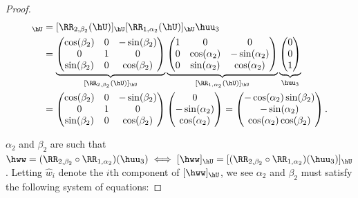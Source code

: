 \begin{proof}
    \begin{align*}
        [(\RR_{2, \beta_2} \circ \RR_{1, \alpha_2})(\huu_3)]_{\hU} &=
        [\RR_{2, \beta_2}(\hU)]_{\hU} [\RR_{1, \alpha_2}(\hU)]_{\hU} \huu_3 \\
        &=
        \underbrace
        {
            \begin{pmatrix}
                \cos(\beta_2) & 0 & -\sin(\beta_2) \\
                0 & 1 & 0 \\
                \sin(\beta_2) & 0 & \cos(\beta_2)
            \end{pmatrix}
        }_{[\RR_{2, \beta_2}(\hU)]_{\hU}}
        \underbrace
        {
            \begin{pmatrix}
                1 & 0 & 0 \\
                0 & \cos(\alpha_2) & -\sin(\alpha_2) \\
                0 & \sin(\alpha_2) & \cos(\alpha_2)
            \end{pmatrix}
        }_{[\RR_{1, \alpha_2}(\hU)]_{\hU}}
        \underbrace
        {
            \begin{pmatrix}
                0 \\ 0 \\ 1
            \end{pmatrix}
        }_{\huu_3} \\
        &=
        \begin{pmatrix}
            \cos(\beta_2) & 0 & -\sin(\beta_2) \\
            0 & 1 & 0 \\
            \sin(\beta_2) & 0 & \cos(\beta_2)
        \end{pmatrix}
        \begin{pmatrix}
            0 \\
            -\sin(\alpha_2) \\
            \cos(\alpha_2)
        \end{pmatrix}
        =
        \begin{pmatrix}
            -\cos(\alpha_2) \sin(\beta_2) \\
            -\sin(\alpha_2) \\
            \cos(\alpha_2) \cos(\beta_2)
        \end{pmatrix}.
    \end{align*}

    \renewcommand{\hw}{\hat{w}}

    $\alpha_2$ and $\beta_2$ are such that $\hww = (\RR_{2, \beta_2} \circ \RR_{1, \alpha_2})(\huu_3) \iff [\hww]_{\hU} = [(\RR_{2, \beta_2} \circ \RR_{1, \alpha_2})(\huu_3)]_{\hU}$. Letting $\hw_i$ denote the $i$th component of $[\hww]_{\hU}$, we see $\alpha_2$ and $\beta_2$ must satisfy the following system of equations:


\end{proof}
